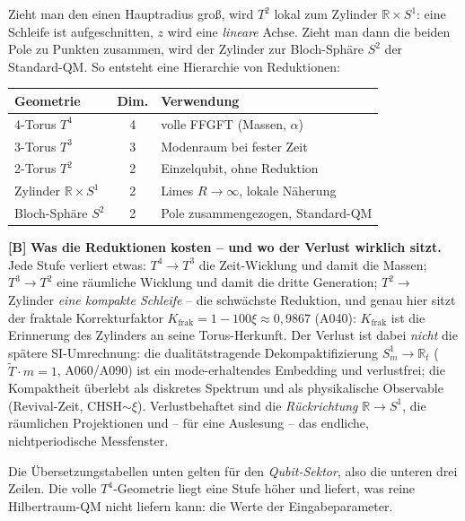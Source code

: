 Zieht man den einen Hauptradius groß, wird $T^2$ lokal zum Zylinder
$\mathbb{R}\times S^1$: eine Schleife ist aufgeschnitten, $z$ wird eine
\emph{lineare} Achse. Zieht man dann die beiden Pole zu Punkten zusammen, wird
der Zylinder zur Bloch-Sphäre $S^2$ der Standard-QM. So entsteht eine Hierarchie
von Reduktionen:

\begin{center}
\renewcommand{\arraystretch}{1.3}
{\small
\begin{tabular}{lcl}
\toprule
\textbf{Geometrie} & \textbf{Dim.} & \textbf{Verwendung} \\
\midrule
4-Torus $T^4$ & 4 & volle FFGFT (Massen, $\alpha$) \\
3-Torus $T^3$ & 3 & Modenraum bei fester Zeit \\
2-Torus $T^2$ & 2 & Einzelqubit, ohne Reduktion \\
Zylinder $\mathbb{R}\times S^1$ & 2 & Limes $R\to\infty$, lokale Näherung \\
Bloch-Sphäre $S^2$ & 2 & Pole zusammengezogen, Standard-QM \\
\bottomrule
\end{tabular}
}
\renewcommand{\arraystretch}{1.0}
\end{center}

\textbf{[B]} \textbf{Was die Reduktionen kosten -- und wo der Verlust wirklich
sitzt.} Jede Stufe verliert etwas: $T^4\to T^3$ die Zeit-Wicklung und damit die
Massen; $T^3\to T^2$ eine räumliche Wicklung und damit die dritte Generation;
$T^2\to$ Zylinder \emph{eine kompakte Schleife} -- die schwächste Reduktion, und
genau hier sitzt der fraktale Korrekturfaktor $K_{\text{frak}} = 1-100\xi
\approx 0{,}9867$ (A040): $K_{\text{frak}}$ ist die Erinnerung des Zylinders an
seine Torus-Herkunft. Der Verlust ist dabei \emph{nicht} die spätere
SI-Umrechnung: die dualitätstragende Dekompaktifizierung $S^1_m\to\mathbb{R}_t$
($\tilde T\cdot m=1$, A060/A090) ist ein mode-erhaltendes Embedding und
verlustfrei; die Kompaktheit überlebt als diskretes Spektrum und als
physikalische Observable (Revival-Zeit, CHSH$\sim\xi$). Verlustbehaftet sind die
\emph{Rückrichtung} $\mathbb{R}\to S^1$, die räumlichen Projektionen und -- für
eine Auslesung -- das endliche, nichtperiodische Messfenster.

Die Übersetzungstabellen unten gelten für den \emph{Qubit-Sektor}, also die
unteren drei Zeilen. Die volle $T^4$-Geometrie liegt eine Stufe höher und
liefert, was reine Hilbertraum-QM nicht liefern kann: die Werte der
Eingabeparameter.

